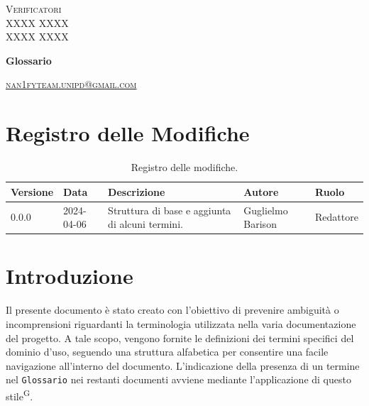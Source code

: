 \documentclass[8pt]{article}
\newcommand{\glossterm}[1]{#1\textsuperscript{G}}
\begin{document}
\begin{titlepage}
\begin{minipage}[t]{0.47\textwidth}
			{\large{\textsc{Verificatori}}
				\vspace{3mm}
				{\\\large{\textsc{XXXX XXXX}\\}} %
				{\large{\textsc{XXXX XXXX}}}
				
			}
			\vspace{4mm}\vspace{4mm}
		\end{minipage}
		\vspace{4cm}
		\begin{center}
			\begin{flushright}
				{\fontsize{30pt}{52pt}\selectfont \textbf{Glossario}} 
			\end{flushright}
			\vspace{3cm}
		\end{center}
		\vspace{10 cm}
		{\small \textsc{\href{mailto: nan1fyteam.unipd@gmail.com}{nan1fyteam.unipd@gmail.com}}}
	\end{titlepage}
	\pagestyle{mystyle}
	\section*{Registro delle Modifiche}
	\begin{table}[ht!]	
		\centering
		\begin{tabular}{p{1.2cm} p{2cm} p{6cm} p{3cm} p{2cm}}
			\toprule
			\textbf{Versione}& \textbf{Data} & \textbf{Descrizione} & \textbf{Autore} & \textbf{Ruolo} \\
			\midrule
			0.0.0 & 2024-04-06 & Struttura di base e aggiunta di alcuni termini.  & Guglielmo Barison & Redattore \\%
			\bottomrule
		\end{tabular}
		\caption{Registro delle modifiche.}
		\label{table:Registro delle modifiche}
	\end{table}
	\newpage
	\tableofcontents
	\clearpage
	\newpage
	\justifying
	\section{Introduzione}
	Il presente documento è stato creato con l'obiettivo di prevenire ambiguità o incomprensioni riguardanti la terminologia utilizzata nella varia documentazione del progetto. A tale scopo, vengono fornite le definizioni dei termini specifici del dominio d'uso, seguendo una struttura alfabetica per consentire una facile navigazione all'interno del documento. L'indicazione della presenza di un termine nel \texttt{Glossario} nei restanti documenti avviene mediante l'applicazione di \glossterm{questo stile}.
	\newpage
	
\end{document}
